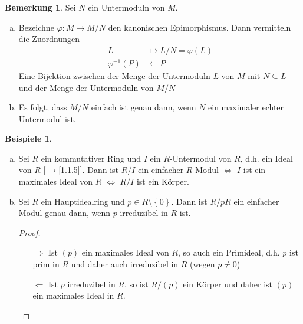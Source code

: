 \documentclass[
twoside=semi,
fontsize=12,
DIV=12, 
cleardoublepage=current,
leqno,
headings=optiontoheadandtoc, 
toc=idx
]{scrbook}
\newcommand{\set}[1]{\left\{ #1 \right\}}
\theoremstyle{definition}
\newtheorem{bemerkung}[definition]{Bemerkung}
\newtheorem{beispiele}[definition]{Beispiele}
\begin{document}
	\begin{bemerkung}\label{1.3.3}
		Sei $N$ ein Untermoduln von $M$.
		\begin{enumerate}[(a)]
			\item Bezeichne $\varphi: M \to M/N$ den kanonischen Epimorphismus. Dann vermitteln die Zuordnungen
			\begin{align*}
				L &\mapsto L/N = \varphi(L) \\
				\varphi^{-1}(P) &\mapsfrom P
			\end{align*}
			Eine Bijektion zwischen der Menge der Untermoduln $L$ von $M$ mit $N \subseteq L$ und der Menge der Untermoduln von $M/N$
					
			\item Es folgt, dass $M/N$ einfach ist genau dann, wenn $N$ ein maximaler echter Untermodul ist.
		\end{enumerate}
	\end{bemerkung}

	\begin{beispiele}\label{1.3.4}
		\begin{enumerate}[(a)]
			\item Sei $R$ ein kommutativer Ring und $I$ ein $R$-Untermodul von $R$, d.h. ein Ideal von $R$ [$\to$\ref{1.1.5}]. Dann ist $R/I$ ein einfacher $R$-Modul $\Leftrightarrow$ $I$ ist ein maximales Ideal von $R$ $\Leftrightarrow$ $R/I$ ist ein K\"orper.
			
			\item Sei $R$ ein Hauptidealring und $p \in R\setminus \set{0}$. Dann ist $R/pR$ ein einfacher Modul genau dann, wenn $p$ irreduzibel in $R$ ist.
			
			\begin{proof}
				\begin{itemize}
					\item[$\Rightarrow$] Ist $(p)$ ein maximales Ideal von $R$, so auch ein Primideal, d.h. $p$ ist prim in $R$ und daher auch irreduzibel in $R$ (wegen $p \neq 0$) 
					
					\item[$\Leftarrow$] Ist $p$ irreduzibel in $R$, so ist $R/(p)$ ein K\"orper und daher ist $(p)$ ein maximales Ideal in $R$.
				\end{itemize}
			\end{proof}
		\end{enumerate}
	\end{beispiele}
\end{document}
